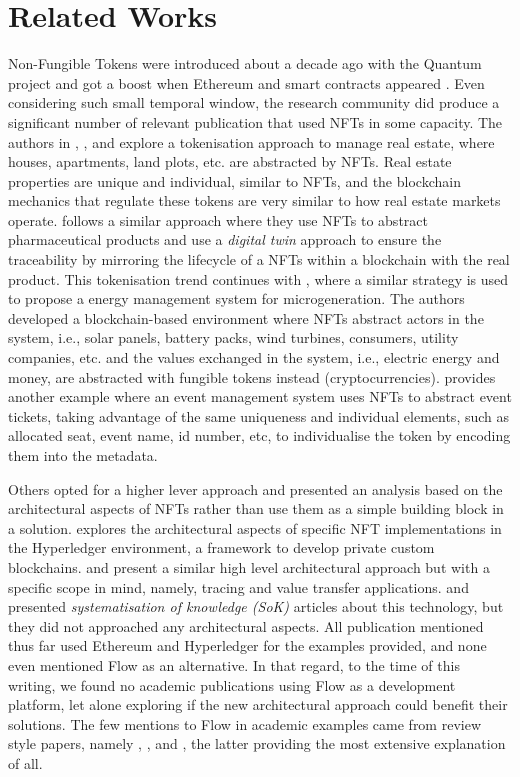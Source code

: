 \documentclass[../NFTComp_IEEE.tex]{subfiles}
\begin{document}
\section{Related Works}
\label{sec:related_works}
Non-Fungible Tokens were introduced about a decade ago with the Quantum project and got a boost when Ethereum and smart contracts appeared \cite{Exmundo2023}. Even considering such small temporal window, the research community did produce a significant number of relevant publication that used NFTs in some capacity. The authors in \cite{Hung2023}, \cite{Barbuta2024}, and \cite{Sharma2024} explore a tokenisation approach to manage real estate, where houses, apartments, land plots, etc. are abstracted by NFTs. Real estate properties are unique and individual, similar to NFTs, and the blockchain mechanics that regulate these tokens are very similar to how real estate markets operate. \cite{Chiacchio2022} follows a similar approach where they use NFTs to abstract pharmaceutical products and use a \textit{digital twin} approach to ensure the traceability by mirroring the lifecycle of a NFTs within a blockchain with the real product. This tokenisation trend continues with \cite{Karandikar2021}, where a similar strategy is used to propose a energy management system for microgeneration. The authors developed a blockchain-based environment where NFTs abstract actors in the system, i.e., solar panels, battery packs, wind turbines, consumers, utility companies, etc. and the values exchanged in the system, i.e., electric energy and money, are abstracted with fungible tokens instead (cryptocurrencies). \cite{Regner2019} provides another example where an event management system uses NFTs to abstract event tickets, taking advantage of the same uniqueness and individual elements, such as allocated seat, event name, id number, etc, to individualise the token by encoding them into the metadata.
\par
Others opted for a higher lever approach and presented an analysis based on the architectural aspects of NFTs rather than use them as a simple building block in a solution. \cite{Hong2019} explores the architectural aspects of specific NFT implementations in the Hyperledger environment, a framework to develop private custom blockchains. \cite{Yang2022} and \cite{Bal2019} present a similar high level architectural approach but with a specific scope in mind, namely, tracing and value transfer applications. \cite{Wang2021b} and \cite{Ma2023} presented \textit{systematisation of knowledge (SoK)} articles about this technology, but they did not approached any architectural aspects. All publication mentioned thus far used Ethereum and Hyperledger for the examples provided, and none even mentioned Flow as an alternative. In that regard, to the time of this writing, we found no academic publications using Flow as a development platform, let alone exploring if the new architectural approach could benefit their solutions. The few mentions to Flow in academic examples came from review style papers, namely \cite{Wang2021}, \cite{Razi2024}, and \cite{Guidi2023}, the latter providing the most extensive explanation of all.
\end{document}

